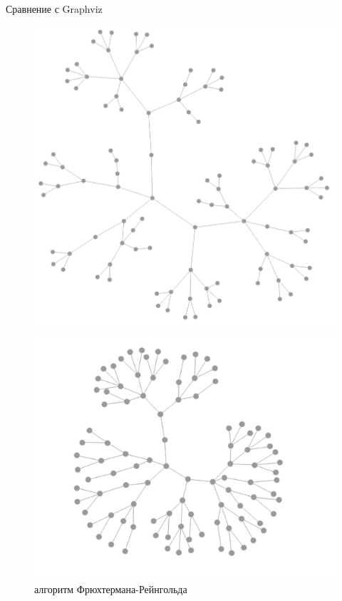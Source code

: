 \documentclass{beamer}
\begin{document}
\begin{frame}{Сравнение с Graphviz}
	\begin{figure}[H]
		\centering
		\begin{minipage}[t]{.32\textwidth}
			\centering
			\includegraphics[width=\linewidth]{./imgs/fr_quad_tree.png}
			\caption*{алгоритм Фрюхтермана-Рейнгольда}
		\end{minipage}
		\noindent
		\begin{minipage}[t]{.32\textwidth}
			\centering
			\includegraphics[width=\linewidth]{./imgs/kk_quad_tree.png}

\end{minipage}
\end{figure}
\end{frame}
\end{document}

